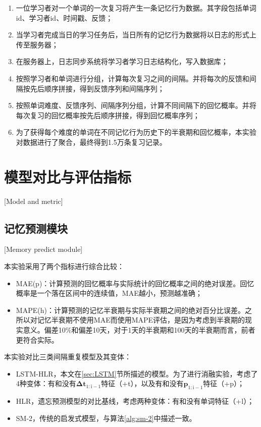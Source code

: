 \begin{enumerate}
    \item 一位学习者对一个单词的一次复习将产生一条记忆行为数据。其字段包括单词id、学习者id、时间戳、反馈；
    \item 当学习者完成当日的学习任务后，当日所有的记忆行为数据将以日志的形式上传至服务器；
    \item 在服务器上，日志同步系统将学习者学习日志结构化，写入数据库；
    \item 按照学习者和单词进行分组，计算每次复习之间的间隔。并将每次的反馈和间隔按先后顺序拼接，得到反馈序列和间隔序列；
    \item 按照单词难度、反馈序列、间隔序列分组，计算不同间隔下的回忆概率。并将每次复习的回忆概率按先后顺序拼接，得到回忆概率序列；
    \item 为了获得每个难度的单词在不同记忆行为历史下的半衰期和回忆概率，本实验对数据进行了聚合，最终得到1.5万条复习记录。
\end{enumerate}

\section{模型对比与评估指标}[Model and metric]

\subsection{记忆预测模块}[Memory predict module]

本实验采用了两个指标进行综合比较：

\begin{itemize}
    \item MAE(p)：计算预测的回忆概率与实际统计的回忆概率之间的绝对误差。回忆概率是一个落在区间中的连续值，MAE越小，预测越准确；
    \item MAPE(h)：计算预测的记忆半衰期与实际半衰期之间的绝对百分比误差。之所以对记忆半衰期不使用MAE而使用MAPE评估，是因为考虑到半衰期的现实意义。偏差10\%和偏差10天，对于1天的半衰期和100天的半衰期而言，前者更符合实际。
\end{itemize}

本实验对比三类间隔重复模型及其变体：

\begin{itemize}
    \item LSTM-HLR，本文在\ref{sec:LSTM}节所描述的模型。为了进行消融实验，考虑了4种变体：有和没有$\bm{\Delta t}_\mathrm{1:i-1}$特征（+t），以及有和没有$\bm p_\mathrm{1:i-1}$特征（+p）；
    \item HLR，遗忘预测模型的对比基线，考虑两种变体：有和没有单词特征（+l）；
    \item SM-2，传统的启发式模型，与算法\ref{alg:sm-2}中描述一致。
\end{itemize}

